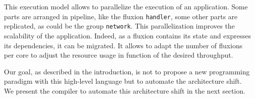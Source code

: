 This execution model allows to parallelize the execution of an application.
Some parts are arranged in pipeline, like the fluxion \texttt{handler}, some other parts are replicated, as could be the group \texttt{network}.
This parallelization improves the scalability of the application.
Indeed, as a fluxion contains its state and expresses its dependencies, it can be migrated.
It allows to adapt the number of fluxions per core to adjust the resource usage in function of the desired throughput.



Our goal, as described in the introduction, is not to propose a new programming paradigm with this high-level language but to automate the architecture shift.
We present the compiler to automate this architecture shift in the next section.